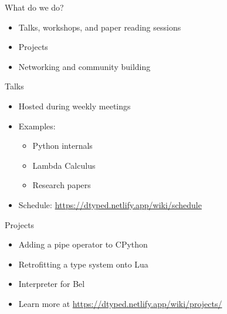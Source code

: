 \documentclass{beamer}
\begin{document}
\begin{frame}{What do we do?}
  \begin{itemize}
  \item Talks, workshops, and paper reading sessions
  \item Projects
  \item Networking and community building
  \end{itemize}
\end{frame}

\begin{frame}{Talks}
  \begin{itemize}
    \item Hosted during weekly meetings
    \item Examples:
      \begin{itemize}
        \item Python internals
        \item Lambda Calculus
        \item Research papers
      \end{itemize}
    \item Schedule: \url{https://dtyped.netlify.app/wiki/schedule}
  \end{itemize}
\end{frame}

\begin{frame}{Projects}
  \begin{itemize}
    \item Adding a pipe operator to CPython
    \item Retrofitting a type system onto Lua
    \item Interpreter for Bel
    \item Learn more at \url{https://dtyped.netlify.app/wiki/projects/}
  \end{itemize}
\end{frame}
\end{document}
